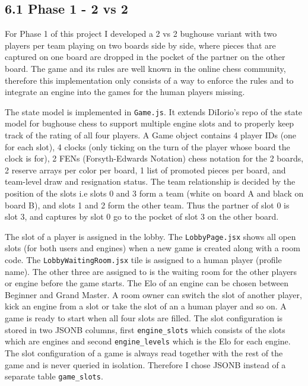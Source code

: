 \documentclass[11pt,a4paper]{article}
\begin{document}
\subsection*{6.1 Phase 1 -  2 vs 2}
For Phase 1 of this project I developed a 2 vs 2 bughouse variant with two players per team playing on two boards side by side, where pieces that are captured on one board are dropped in the pocket of the partner on the other board. The game and its rules are well known in the online chess community, therefore this implementation only consists of a way to enforce the rules and to integrate an engine into the games for the human players missing.

 The state model is implemented in \texttt{Game.js}. It extends DiIorio’s repo of the state model for bughouse chess to support multiple engine slots and to properly keep track of the rating of all four players. A Game object contains 4 player IDs (one for each slot), 4 clocks (only ticking on the turn of the player whose board the clock is for), 2 FENs (Forsyth-Edwards Notation) chess notation for the 2 boards, 2 reserve arrays per color per board, 1 list of promoted pieces per board, and team-level draw and resignation status. The team relationship is decided by the position of the slots i.e slots 0 and 3 form a team (white on board A and black on board B), and slots 1 and 2 form the other team. Thus the partner of slot 0 is slot 3, and captures by slot 0 go to the pocket of slot 3 on the other board.

The slot of a player is assigned in the lobby. The \texttt{LobbyPage.jsx} shows all open slots (for both users and engines) when a new game is created along with a room code. The \texttt{LobbyWaitingRoom.jsx} tile is assigned to a human player (profile name). The other three are assigned to is the waiting room for the other players or engine before the game starts. The Elo of an engine can be chosen between Beginner and Grand Master. A room owner can switch the slot of another player, kick an engine from a slot or take the slot of an a human player and so on. A game is ready to start when all four slots are filled. The slot configuration is stored in two JSONB columns, first  \texttt{engine\_slots} which consists of the slots which are engines and second \texttt{engine\_levels} which is the Elo for each engine. The slot configuration of a game is always read together with the rest of the game and is never queried in isolation. Therefore I chose JSONB instead of a separate table \texttt{game\_slots}.
\end{document}
